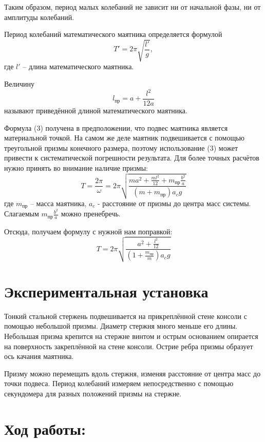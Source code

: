 \documentclass[a5paper, 11pt]{article}
\begin{document}
	Таким образом, период малых колебаний не зависит ни от начальной фазы, ни от амплитуды колебаний. 
	
	Период колебаний математического маятника определяется формулой
	\begin{equation}
		T'=2\pi\sqrt{\frac{l'}{g}},
	\end{equation}
	где $ l' $ -- длина математического маятника.
	\par Величину
	\begin{equation}\label{prived}
		l_\text{пр}=a+\frac{l^2}{12a}
	\end{equation}
	называют приведённой длиной математического маятника. 
	
	\par 
	Формула (3) получена в предположении, что подвес маятника является
	материальной точкой. На самом же деле маятник подвешивается с помощью треугольной призмы конечного размера, поэтому использование (3)
	может привести к систематической погрешности результата. Для более
	точных расчётов нужно принять во внимание наличие призмы:
	\begin{equation}
		T=\frac{2\pi}{\omega}=2\pi\sqrt{\frac{ma^2+\frac{ml^2}{12} + m_\text{пр}\frac{b^2}{a}}{(m + m_\text{пр})a_{c}g}}
	\end{equation}
	\noindent где $m_{пр}$ -- масса маятника, ${a_{c}}$ - расстояние от призмы до центра масс системы. Слагаемым $m_{пр}\frac{b^2}{a}$ можно пренебречь.

	Отсюда, получаем формулу с нужной нам поправкой:
	\begin{equation}\label{period2}
		T=2\pi\sqrt{\frac{a^2+\frac{l^2}{12}}{(1 + \frac{m_\text{пр}}{m})a_{c}g}}
	\end{equation}
\section {Экспериментальная установка}
Тонкий стальной стержень подвешивается на прикреплённой стене консоли с помощью небольшой призмы. Диаметр стержня много меньше его длины. Небольшая призма крепится на стержне винтом и острым основанием опирается на поверхность закреплённой на стене консоли. Острие ребра призмы образует ось качания маятника.

 Призму можно перемещать вдоль стержня, изменяя
расстояние от центра масс до точки подвеса. Период колебаний измеряем непосредственно с помощью секундомера для разных положений призмы на стержне.

\newpage
\section{Ход работы:}
\end{document}
